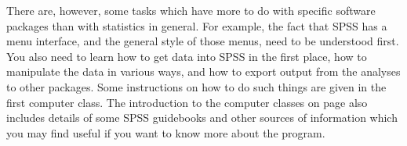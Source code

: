 There are, however, some tasks which have more to do with specific
software packages than with statistics in general. For example, the fact
that SPSS has a menu interface, and the general style of those menus,
need to be understood first. You also need to learn how to get data into
SPSS in the first place, how to manipulate the data in various ways, and
how to export output from the analyses to other packages. Some
instructions on how to do such things are given in the first computer
class. The introduction to the computer classes on page
\pageref{c_class0} also includes details of some SPSS guidebooks and
other sources of information which you may find useful if you want to
know more about the program.
